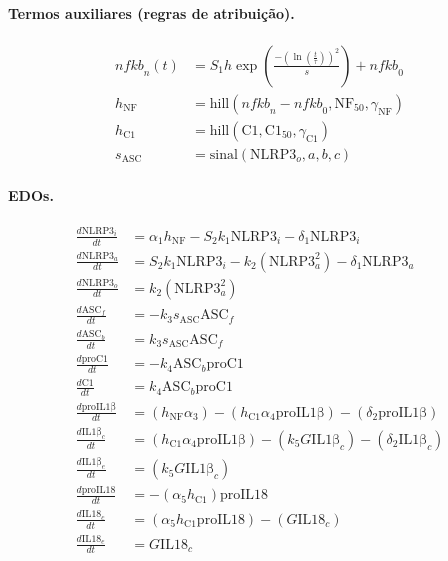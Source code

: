 \documentclass[11pt]{article}
\begin{document}
\paragraph{Termos auxiliares (regras de atribuição).}
\begin{align}
\mathit{nfkb}_n(t) &= S_1 h \exp\left(\frac{-(\ln(\frac{t}{\tau}))^2}{s}\right) + \mathit{nfkb}_0 \\
h_{\mathrm{NF}}  &= \mathrm{hill}(\mathit{nfkb}_n - \mathit{nfkb}_0, \mathrm{NF}_{50}, \gamma_{\mathrm{NF}}) \\
h_{\mathrm{C1}}  &= \mathrm{hill}(\mathrm{C1}, \mathrm{C1}_{50}, \gamma_{\mathrm{C1}}) \\
s_{\mathrm{ASC}} &= \mathrm{sinal}(\mathrm{NLRP3}_o, a, b, c)
\end{align}

\paragraph{EDOs.}
\begin{align}
\frac{d\mathrm{NLRP3}_i}{dt} &= \alpha_1 h_{\mathrm{NF}} - S_2 k_1 \mathrm{NLRP3}_i - \delta_1 \mathrm{NLRP3}_i \\
\frac{d\mathrm{NLRP3}_a}{dt} &= S_2 k_1 \mathrm{NLRP3}_i - k_2 (\mathrm{NLRP3}_a^2) - \delta_1 \mathrm{NLRP3}_a \\
\frac{d\mathrm{NLRP3}_o}{dt} &= k_2 (\mathrm{NLRP3}_a^2) \\
\frac{d\mathrm{ASC}_f}{dt}   &= -k_3 s_{\mathrm{ASC}} \mathrm{ASC}_f \\
\frac{d\mathrm{ASC}_b}{dt}   &= k_3 s_{\mathrm{ASC}} \mathrm{ASC}_f \\
\frac{d\mathrm{proC1}}{dt}   &= -k_4 \mathrm{ASC}_b \mathrm{proC1} \\
\frac{d\mathrm{C1}}{dt}      &= k_4 \mathrm{ASC}_b \mathrm{proC1} \\
\frac{d\mathrm{proIL1\beta}}{dt} &= (h_{\mathrm{NF}} \alpha_3) - (h_{\mathrm{C1}} \alpha_4 \mathrm{proIL1\beta}) - (\delta_2 \mathrm{proIL1\beta}) \\
\frac{d\mathrm{IL1\beta}_c}{dt}  &= (h_{\mathrm{C1}} \alpha_4 \mathrm{proIL1\beta}) - (k_5 G \mathrm{IL1\beta}_c) - (\delta_2 \mathrm{IL1\beta}_c) \\
\frac{d\mathrm{IL1\beta}_e}{dt}  &= (k_5 G \mathrm{IL1\beta}_c) \\
\frac{d\mathrm{proIL18}}{dt} &= -(\alpha_5 h_{\mathrm{C1}}) \mathrm{proIL18} \\
\frac{d\mathrm{IL18}_c}{dt}  &= (\alpha_5 h_{\mathrm{C1}} \mathrm{proIL18}) - (G \mathrm{IL18}_c) \\
\frac{d\mathrm{IL18}_e}{dt}  &= G \mathrm{IL18}_c
\end{align}
\end{document}
